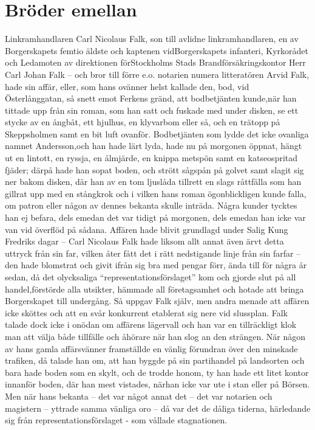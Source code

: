 \documentclass[%
	11pt,			%
	swedish,		%
	]{article}
\begin{document}
\section{Bröder emellan}
Linkramhandlaren Carl Nicolaus Falk, son till avlidne linkramhandlaren, en av 
Borgerskapets femtio äldste och kaptenen vidBorgerskapets infanteri, Kyrkorådet 
och Ledamoten av direktionen förStockholms Stads Brandförsäkringskontor Herr 
Carl Johan Falk -- och bror till förre e.o. notarien numera litteratören Arvid 
Falk, hade sin affär, eller, som hans ovänner helst kallade den, bod, vid 
Österlånggatan, så snett emot Ferkens gränd, att bodbetjänten kunde,när han 
tittade upp från sin roman, som han satt och fuskade med under disken, se ett 
stycke av en ångbåt, ett hjulhus, en klyvarbom eller så, och en trätopp på 
Skeppsholmen samt en bit luft ovanför. Bodbetjänten som lydde det icke ovanliga 
namnet Andersson,och han hade lärt lyda, hade nu på morgonen öppnat, hängt ut 
en lintott, en ryssja, en ålmjärde, en knippa metspön samt en katseospritad 
fjäder; därpå hade han sopat boden, och strött sågspån på golvet samt slagit 
sig ner bakom disken, där han av en tom ljuslåda tillrett en slags råttfälla 
som han gillrat upp med en stångkrok och i vilken hans roman ögonblickligen 
kunde falla, om patron eller någon av dennes bekanta skulle inträda. Några 
kunder tycktes han ej befara, dels emedan det var tidigt på morgonen, dels 
emedan han icke var van vid överflöd på sådana. Affären hade blivit grundlagd 
under Salig Kung Fredriks dagar -- Carl Nicolaus Falk hade liksom allt annat 
även ärvt detta uttryck från sin far, vilken åter fått det i rätt nedstigande 
linje från sin farfar -- den hade blomstrat och givit ifrån sig bra med pengar 
förr, ända till för några år sedan, då det olycksaliga 
``representationsförslaget'' kom och gjorde slut på all handel,förstörde alla 
utsikter, hämmade all företagsamhet och hotade att bringa Borgerskapet till 
undergång. Så uppgav Falk själv, men andra menade att affären icke sköttes och 
att en svår konkurrent etablerat sig nere vid slussplan. Falk talade dock icke 
i onödan om affärens lägervall och han var en tillräckligt klok man att välja 
både tillfälle och åhörare när han slog an den strängen. När någon av hans 
gamla affärsvänner framställde en vänlig förundran över den minskade trafiken, 
då talade han om, att han byggde på sin partihandel på landsorten och bara hade 
boden som en skylt, och de trodde honom, ty han hade ett litet kontor innanför 
boden, där han mest vistades, närhan icke var ute i stan eller på Börsen. Men 
när hans bekanta -- det var något annat det -- det var notarien och magistern 
-- yttrade samma vänliga oro -- då var det de dåliga tiderna, härledande sig 
från representationsförslaget - som vållade stagnationen.
\end{document}
